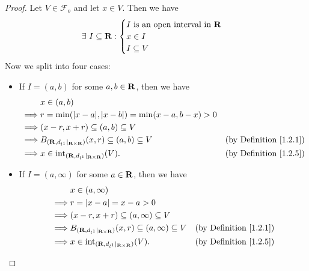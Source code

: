 \begin{proof}
    Let \(V \in \mathcal{F}_o\) and let \(x \in V\).
    Then we have
    \[
        \exists\ I \subseteq \mathbf{R} : \begin{cases}
            I \text{ is an open interval in } \mathbf{R} \\
            x \in I                              \\
            I \subseteq V
        \end{cases}
    \]
    Now we split into four cases:
    \begin{itemize}
        \item If \(I = (a, b)\) for some \(a, b \in \mathbf{R}\), then we have
              \begin{align*}
                           & x \in (a, b)                                                                                              \\
                  \implies & r = \min(\abs{x - a}, \abs{x - b}) = \min(x - a, b - x) > 0                                               \\
                  \implies & (x - r, x + r) \subseteq (a, b) \subseteq V                                                               \\
                  \implies & B_{(\R, d_{l^1}|_{\R \times \R})}(x, r) \subseteq (a, b) \subseteq V & \text{(by Definition \ref{1.2.1})} \\
                  \implies & x \in \text{int}_{(\R, d_{l^1}|_{\R \times \R})}(V).                 & \text{(by Definition \ref{1.2.5})}
              \end{align*}
        \item If \(I = (a, \infty)\) for some \(a \in \mathbf{R}\), then we have
              \begin{align*}
                           & x \in (a, \infty)                                                                                              \\
                  \implies & r = \abs{x - a} = x - a > 0                                                                                    \\
                  \implies & (x - r, x + r) \subseteq (a, \infty) \subseteq V                                                               \\
                  \implies & B_{(\R, d_{l^1}|_{\R \times \R})}(x, r) \subseteq (a, \infty) \subseteq V & \text{(by Definition \ref{1.2.1})} \\
                  \implies & x \in \text{int}_{(\R, d_{l^1}|_{\R \times \R})}(V).                      & \text{(by Definition \ref{1.2.5})}

\end{align*}
\end{itemize}
\end{proof}
